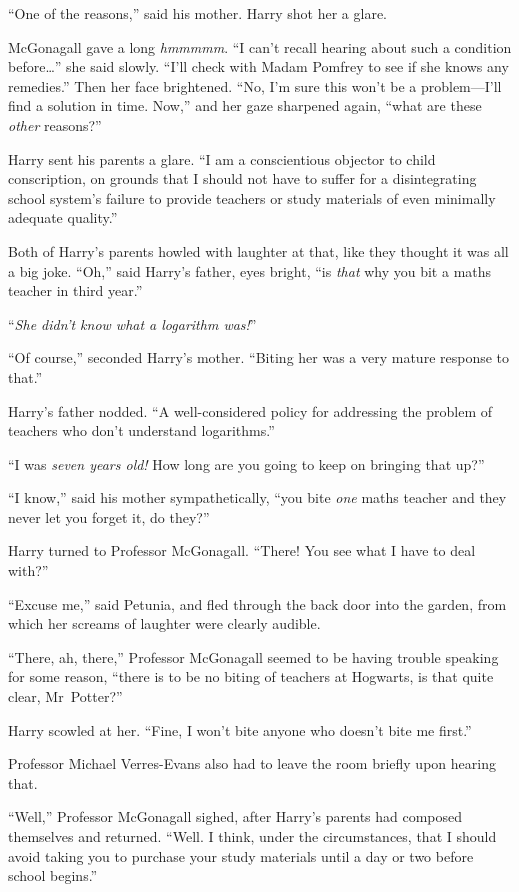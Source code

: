 “One of the reasons,” said his mother. Harry shot her a glare.

McGonagall gave a long \emph{hmmmmm}. “I can’t recall hearing about such a condition before…” she said slowly. “I’ll check with Madam Pomfrey to see if she knows any remedies.” Then her face brightened. “No, I’m sure this won’t be a problem—I’ll find a solution in time. Now,” and her gaze sharpened again, “what are these \emph{other} reasons?”

Harry sent his parents a glare. “I am a conscientious objector to child conscription, on grounds that I should not have to suffer for a disintegrating school system’s failure to provide teachers or study materials of even minimally adequate quality.”

Both of Harry’s parents howled with laughter at that, like they thought it was all a big joke. “Oh,” said Harry’s father, eyes bright, “is \emph{that} why you bit a maths teacher in third year.”

“\emph{She didn’t know what a logarithm was!}”

“Of course,” seconded Harry’s mother. “Biting her was a very mature response to that.”

Harry’s father nodded. “A well-considered policy for addressing the problem of teachers who don’t understand logarithms.”

“I was \emph{seven years old!} How long are you going to keep on bringing that up?”

“I know,” said his mother sympathetically, “you bite \emph{one} maths teacher and they never let you forget it, do they?”

Harry turned to Professor McGonagall. “There! You see what I have to deal with?”

“Excuse me,” said Petunia, and fled through the back door into the garden, from which her screams of laughter were clearly audible.

“There, ah, there,” Professor McGonagall seemed to be having trouble speaking for some reason, “there is to be no biting of teachers at Hogwarts, is that quite clear, Mr~Potter?”

Harry scowled at her. “Fine, I won’t bite anyone who doesn’t bite me first.”

Professor Michael Verres-Evans also had to leave the room briefly upon hearing that.

“Well,” Professor McGonagall sighed, after Harry’s parents had composed themselves and returned. “Well. I think, under the circumstances, that I should avoid taking you to purchase your study materials until a day or two before school begins.”

